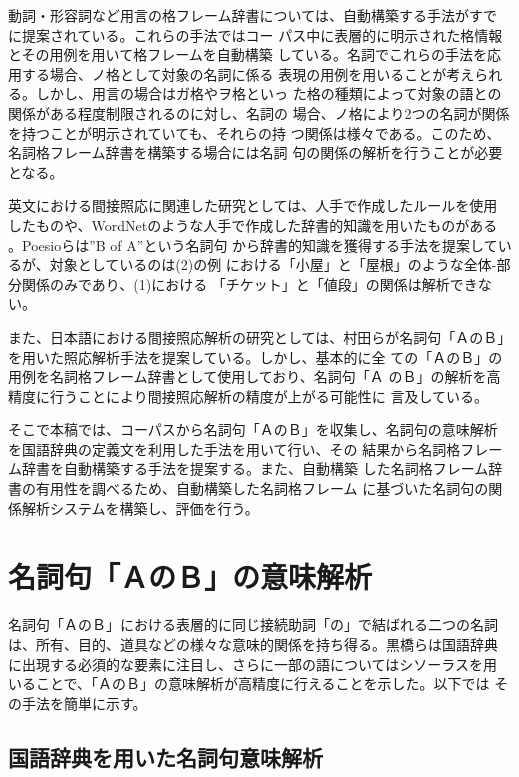 \documentclass{nlp}
\begin{document}
 動詞・形容詞など用言の格フレーム辞書については、自動構築する手法がすで
 に提案されている\cite{Briscoe1997,Kawahara2002e}。これらの手法ではコー
 パス中に表層的に明示された格情報とその用例を用いて格フレームを自動構築
 している。名詞でこれらの手法を応用する場合、ノ格として対象の名詞に係る
 表現の用例を用いることが考えられる。しかし、用言の場合はガ格やヲ格といっ
 た格の種類によって対象の語との関係がある程度制限されるのに対し、名詞の
 場合、ノ格により2つの名詞が関係を持つことが明示されていても、それらの持
 つ関係は様々である。このため、名詞格フレーム辞書を構築する場合には名詞
 句の関係の解析を行うことが必要となる。
 
 英文における間接照応に関連した研究としては、人手で作成したルールを使用
 したものや、WordNetのような人手で作成した辞書的知識を用いたものがある
 \cite{Hahn1996,Vieira2000,Strube1999}。Poesioらは''B of A''という名詞句
 から辞書的知識を獲得する手法を提案しているが、対象としているのは(2)の例
 における「小屋」と「屋根」のような全体-部分関係のみであり、(1)における
 「チケット」と「値段」の関係は解析できない\cite{Poesio2002}。

 また、日本語における間接照応解析の研究としては、村田らが名詞句「ＡのＢ」
 を用いた照応解析手法を提案している\cite{Murata1999}。しかし、基本的に全
 ての「ＡのＢ」の用例を名詞格フレーム辞書として使用しており、名詞句「Ａ
 のＢ」の解析を高精度に行うことにより間接照応解析の精度が上がる可能性に
 言及している。
 
 そこで本稿では、コーパスから名詞句「ＡのＢ」を収集し、名詞句の意味解析
 を国語辞典の定義文を利用した手法\cite{Kurohashi1999}を用いて行い、その
 結果から名詞格フレーム辞書を自動構築する手法を提案する。また、自動構築
 した名詞格フレーム辞書の有用性を調べるため、自動構築した名詞格フレーム
 に基づいた名詞句の関係解析システムを構築し、評価を行う。

\section{名詞句「ＡのＢ」の意味解析}
 \label{意味解析}
 
 名詞句「ＡのＢ」における表層的に同じ接続助詞「の」で結ばれる二つの名詞
 は、所有、目的、道具などの様々な意味的関係を持ち得る。黒橋らは国語辞典
 に出現する必須的な要素に注目し、さらに一部の語についてはシソーラスを用
 いることで、「ＡのＢ」の意味解析が高精度に行えることを示した。以下では
 その手法を簡単に示す。
 
  \subsection{国語辞典を用いた名詞句意味解析}
  
\end{document}
